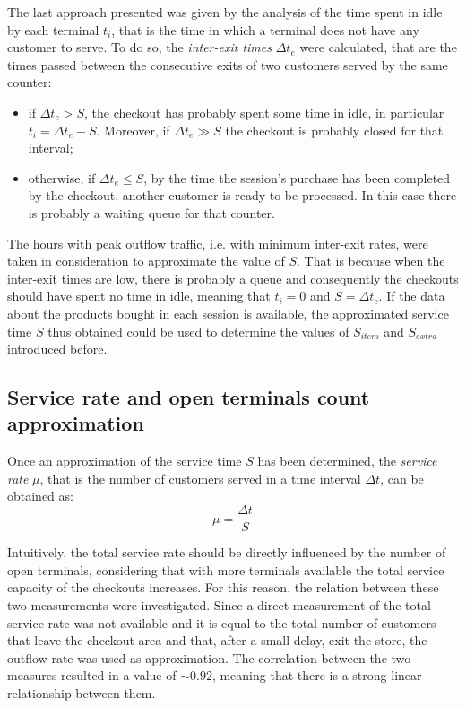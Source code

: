 The last approach presented was given by the analysis of the time spent in idle by each terminal \( t_i \), that is the time in which a terminal does not have any customer to serve. To do so, the \emph{inter-exit times} \( \Delta t_e \) were calculated, that are the times passed between the consecutive exits of two customers served by the same counter:
\begin{itemize}
  \item if \( \Delta t_e > S \), the checkout has probably spent some time in idle, in particular \( t_i = \Delta t_e - S \). Moreover, if \( \Delta t_e \gg S \) the checkout is probably closed for that interval;
  \item otherwise, if \( \Delta t_e \le S \), by the time the session’s purchase has been completed by the checkout, another customer is ready to be processed. In this case there is probably a waiting queue for that counter.
\end{itemize}

The hours with peak outflow traffic, i.e. with minimum inter-exit rates, were taken in consideration to approximate the value of \( S \). That is because when the inter-exit times are low, there is probably a queue and consequently the checkouts should have spent no time in idle, meaning that \( t_i = 0 \) and \( S = \Delta t_e \). If the data about the products bought in each session is available, the approximated service time \( S \) thus obtained could be used to determine the values of \( S_{item} \) and \( S_{extra} \) introduced before.

\subsection{Service rate and open terminals count approximation}
\label{subsec:service_rate_and_open_terminals_count_approximation}

Once an approximation of the service time \( S \) has been determined, the \emph{service rate} \( \mu \), that is the number of customers served in a time interval \( \Delta t \), can be obtained as:
\begin{equation}
  \mu = \frac{\Delta t}{S}
\end{equation}

Intuitively, the total service rate should be directly influenced by the number of open terminals, considering that with more terminals available the total service capacity of the checkouts increases. For this reason, the relation between these two measurements were investigated. Since a direct measurement of the total service rate was not available and it is equal to the total number of customers that leave the checkout area and that, after a small delay, exit the store, the outflow rate was used as approximation. The correlation between the two measures resulted in a value of \( \sim0.92 \), meaning that there is a strong linear relationship between them.

